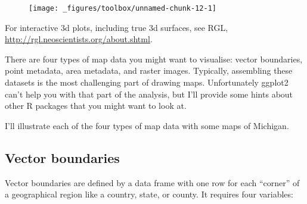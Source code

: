 \begin{Shaded}
\begin{Highlighting}[]
\StringTok{ }\NormalTok{faithfuld[}\NormalTok{(}\NormalTok{, } \NormalTok{), ]}
\StringTok{ }
\StringTok{  }\NormalTok{(}\NormalTok{(}  \NormalTok{/}\NormalTok{) +}\StringTok{ }
\StringTok{  }\NormalTok{()}
\end{Highlighting}
\end{Shaded}

\begin{figure}[H]
  \texttt{[image: \_figures/toolbox/unnamed-chunk-12-1]}
\end{figure}

For interactive 3d plots, including true 3d surfaces, see RGL,
\url{http://rgl.neoscientists.org/about.shtml}.


 

There are four types of map data you might want to visualise: vector
boundaries, point metadata, area metadata, and raster images. Typically,
assembling these datasets is the most challenging part of drawing maps.
Unfortunately ggplot2 can't help you with that part of the analysis, but
I'll provide some hints about other R packages that you might want to
look at.

I'll illustrate each of the four types of map data with some maps of
Michigan.

\subsection{Vector boundaries}

Vector boundaries are defined by a data frame with one row for each
``corner'' of a geographical region like a country, state, or county. It
requires four variables:

